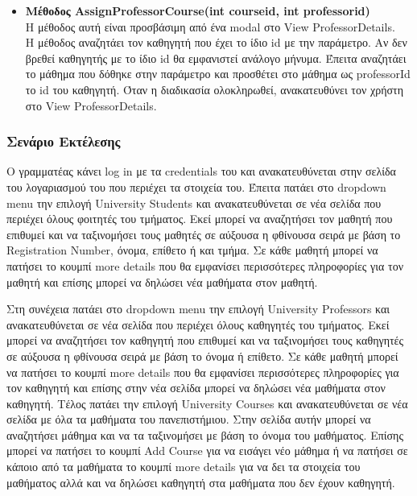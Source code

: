 \documentclass[12pt]{article}
\begin{document}
\begin{itemize}
	\item \textbf{Μέθοδος AssignProfessorCourse(int courseid, int professorid)}\\
	Η μέθοδος αυτή είναι προσβάσιμη από ένα modal στο View ProfessorDetails.\\
	Η μέθοδος αναζητάει τον καθηγητή που έχει το ίδιο id με την παράμετρο. Αν δεν βρεθεί καθηγητής με το ίδιο id θα εμφανιστεί ανάλογο μήνυμα. Έπειτα αναζητάει το μάθημα που δόθηκε στην παράμετρο και προσθέτει στο μάθημα ως professorId το id του καθηγητή. Όταν η διαδικασία ολοκληρωθεί, ανακατευθύνει τον χρήστη στο View ProfessorDetails.
	
\end{itemize}
	
	
\subsubsection{Σενάριο Εκτέλεσης}
Ο γραμματέας κάνει log in με τα credentials του και ανακατευθύνεται στην σελίδα του λογαριασμού του που περιέχει τα στοιχεία του. Έπειτα πατάει στο dropdown menu την επιλογή University Students και ανακατευθύνεται σε νέα σελίδα που περιέχει όλους φοιτητές του τμήματος. Εκεί μπορεί να αναζητήσει τον μαθητή που επιθυμεί και να ταξινομήσει τους μαθητές σε αύξουσα η φθίνουσα σειρά με βάση το Registration Number, όνομα, επίθετο ή και τμήμα. Σε κάθε μαθητή μπορεί να πατήσει το κουμπί more details που θα εμφανίσει περισσότερες πληροφορίες  για τον μαθητή και επίσης μπορεί να δηλώσει νέα μαθήματα στον μαθητή. 

Στη συνέχεια πατάει στο dropdown menu την επιλογή University Professors και ανακατευθύνεται σε νέα σελίδα που περιέχει όλους καθηγητές του τμήματος. Εκεί μπορεί να αναζητήσει τον καθηγητή που επιθυμεί και να ταξινομήσει τους καθηγητές σε αύξουσα η φθίνουσα σειρά με βάση το  όνομα ή  επίθετο. Σε κάθε μαθητή μπορεί να πατήσει το κουμπί more details που θα εμφανίσει περισσότερες πληροφορίες  για τον καθηγητή και επίσης στην νέα σελίδα μπορεί να δηλώσει νέα μαθήματα στον καθηγητή. Τέλος πατάει την επιλογή University Courses και ανακατευθύνεται σε νέα σελίδα με όλα τα μαθήματα του πανεπιστήμιου. Στην σελίδα αυτήν μπορεί να αναζητήσει μάθημα και να τα ταξινομήσει με βάση το όνομα του μαθήματος. Επίσης μπορεί να πατήσει το κουμπί Add Course για να εισάγει νέο μάθημα ή να πατήσει σε κάποιο από τα μαθήματα το κουμπί more details για να δει τα στοιχεία του μαθήματος αλλά και να δηλώσει καθηγητή στα μαθήματα που δεν έχουν καθηγητή.

	
\end{document}
